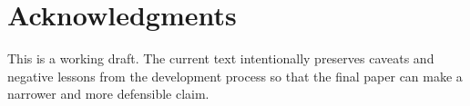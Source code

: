 \section*{Acknowledgments}

This is a working draft. The current text intentionally preserves caveats and negative lessons
from the development process so that the final paper can make a narrower and more defensible
claim.
